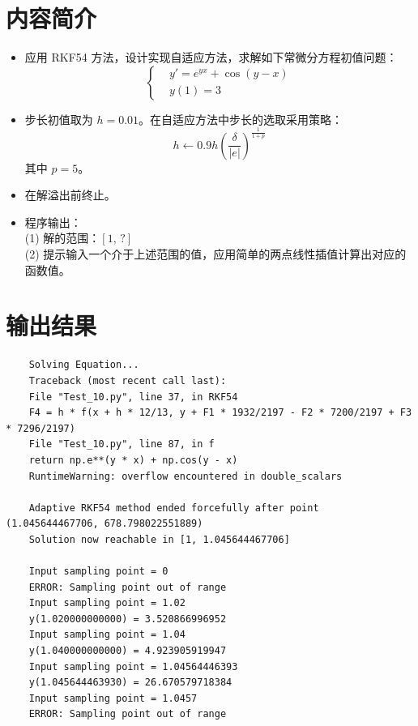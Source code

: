 \documentclass{ctexart}
\begin{document}
\section*{内容简介}
	\begin{itemize}
		\item 应用 RKF54 方法，设计实现自适应方法，求解如下常微分方程初值问题：
		\begin{equation}
		\left\{\begin{aligned}
			&y' = e^{yx} + \cos(y − x)\\
			&y(1) = 3
		\end{aligned}\right.
		\end{equation}
		
		\item 步长初值取为 $h = 0.01$。在自适应方法中步长的选取采用策略：
		\begin{equation}
			h \leftarrow 0.9 h\left(\dfrac{\delta}{|e|}\right)^{\frac{1}{1+p}}
		\end{equation}
		其中 $p = 5$。
		
		\item 在解溢出前终止。
		
		\item 程序输出：\\
			(1) 解的范围：$[1,\,?]$\\
			(2)
提示输入一个介于上述范围的值，应用简单的两点线性插值计算出对应的函数值。
	\end{itemize}

\section*{输出结果}
\begin{verbatim}
	Solving Equation...
	Traceback (most recent call last):
	File "Test_10.py", line 37, in RKF54
	F4 = h * f(x + h * 12/13, y + F1 * 1932/2197 - F2 * 7200/2197 + F3 * 7296/2197)
	File "Test_10.py", line 87, in f
	return np.e**(y * x) + np.cos(y - x)
	RuntimeWarning: overflow encountered in double_scalars
	
	Adaptive RKF54 method ended forcefully after point (1.045644467706, 678.798022551889)
	Solution now reachable in [1, 1.045644467706]
	
	Input sampling point = 0
	ERROR: Sampling point out of range
	Input sampling point = 1.02
	y(1.020000000000) = 3.520866996952
	Input sampling point = 1.04
	y(1.040000000000) = 4.923905919947
	Input sampling point = 1.04564446393
	y(1.045644463930) = 26.670579718384
	Input sampling point = 1.0457
	ERROR: Sampling point out of range
\end{verbatim}
\end{document}
